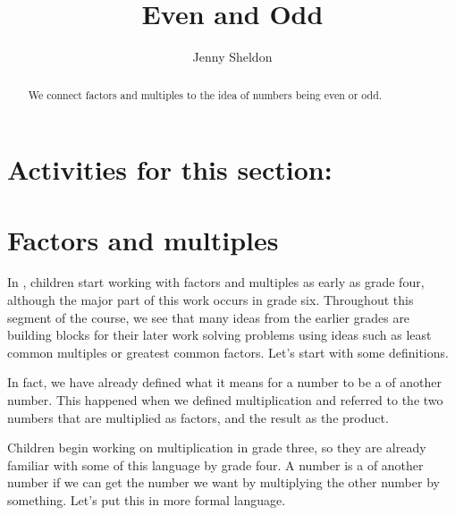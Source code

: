 \documentclass{ximera}
\title{Even and Odd}
\author{Jenny Sheldon}
\begin{document}
\begin{abstract}
We connect factors and multiples to the idea of numbers being even or odd.
\end{abstract}
\maketitle

\section{Activities for this section:} 

\section{Factors and multiples}

In , children start working with factors and multiples as early as grade four, although the major part of this work occurs in grade six. Throughout this segment of the course, we see that many ideas from the earlier grades are building blocks for their later work solving problems using ideas such as least common multiples or greatest common factors. Let's start with some definitions. 

In fact, we have already defined what it means for a number to be a  of another number. This happened when we defined multiplication and referred to the two numbers that are multiplied as factors, and the result as the product.
\begin{image}
\end{image}
Children begin working on multiplication in grade three, so they are already familiar with some of this language by grade four. A number is a  of another number if we can get the number we want by multiplying the other number by something. Let's put this in more formal language.
\end{document}
